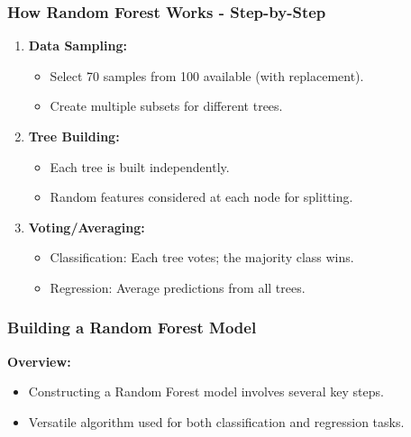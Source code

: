 \documentclass[aspectratio=169]{beamer}
\begin{document}
\begin{frame}[fragile]
    \frametitle{How Random Forest Works - Step-by-Step}
    \begin{enumerate}
        \item \textbf{Data Sampling:}
            \begin{itemize}
                \item Select 70 samples from 100 available (with replacement).
                \item Create multiple subsets for different trees.
            \end{itemize}
            
        \item \textbf{Tree Building:}
            \begin{itemize}
                \item Each tree is built independently.
                \item Random features considered at each node for splitting.
            \end{itemize}

        \item \textbf{Voting/Averaging:}
            \begin{itemize}
                \item Classification: Each tree votes; the majority class wins.
                \item Regression: Average predictions from all trees.
            \end{itemize}
    \end{enumerate}
\end{frame}

\begin{frame}
    \frametitle{Building a Random Forest Model}
    \textbf{Overview:}
    
    \begin{itemize}
        \item Constructing a Random Forest model involves several key steps.
        \item Versatile algorithm used for both classification and regression tasks.
    \end{itemize}
\end{frame}
\end{document}
